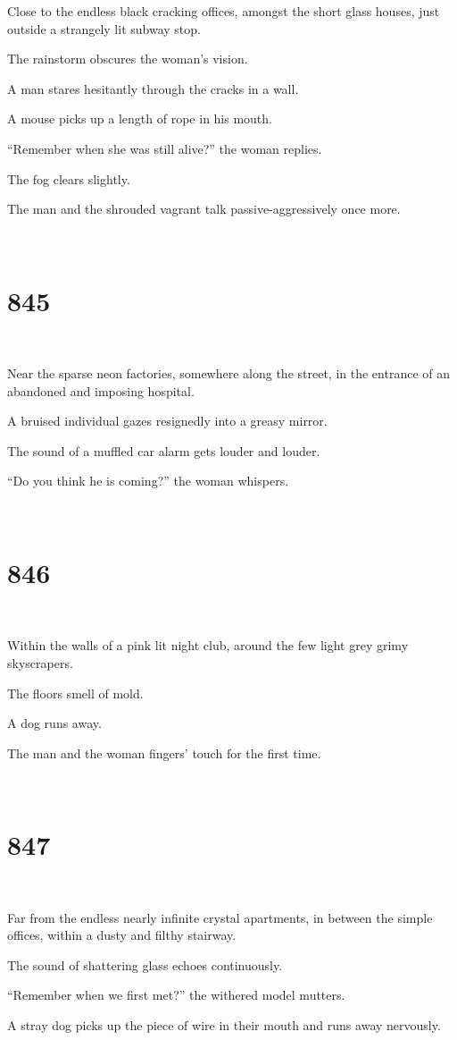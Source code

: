 \documentclass{report}
\begin{document}
Close to the endless black cracking offices, amongst the short glass houses, just outside a strangely lit subway stop.

The rainstorm obscures the woman's vision.

A man stares hesitantly through the cracks in a wall.

A mouse picks up a length of rope in his mouth.

``Remember when she was still alive?'' the woman replies.

The fog clears slightly.

The man and the shrouded vagrant talk passive-aggressively once more.

~
\chapter*{845}
~

Near the sparse neon factories, somewhere along the street, in the entrance of an abandoned and imposing hospital.

A bruised individual gazes resignedly into a greasy mirror.

The sound of a muffled car alarm gets louder and louder.

``Do you think he is coming?'' the woman whispers.

~
\chapter*{846}
~

Within the walls of a pink lit night club, around the few light grey grimy skyscrapers.

The floors smell of mold.

A dog runs away.

The man and the woman fingers' touch for the first time.

~
\chapter*{847}
~

Far from the endless nearly infinite crystal apartments, in between the simple offices, within a dusty and filthy stairway.

The sound of shattering glass echoes continuously.

``Remember when we first met?'' the withered model mutters.

A stray dog picks up the piece of wire in their mouth and runs away nervously.
\end{document}
